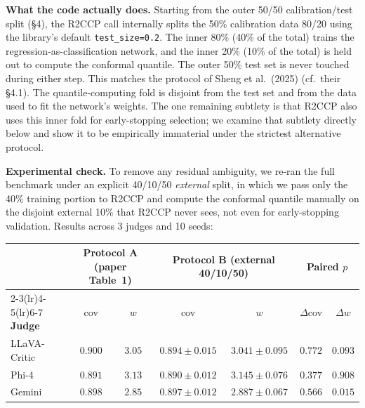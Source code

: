 \documentclass[11pt]{article}
\begin{document}
\textbf{What the code actually does.} Starting from the outer 50/50 calibration/test split (\S 4), the R2CCP call internally splits the 50\% calibration data 80/20 using the library's default \texttt{test\_size=0.2}. The inner 80\% (40\% of the total) trains the regression-as-classification network, and the inner 20\% (10\% of the total) is held out to compute the conformal quantile. The outer 50\% test set is never touched during either step. This matches the protocol of Sheng et al.\ (2025) (cf.\ their \S 4.1). The quantile-computing fold is disjoint from the test set and from the data used to fit the network's weights. The one remaining subtlety is that R2CCP also uses this inner fold for early-stopping selection; we examine that subtlety directly below and show it to be empirically immaterial under the strictest alternative protocol.

\textbf{Experimental check.} To remove any residual ambiguity, we re-ran the full benchmark under an explicit 40/10/50 \emph{external} split, in which we pass only the 40\% training portion to R2CCP and compute the conformal quantile manually on the disjoint external 10\% that R2CCP never sees, not even for early-stopping validation. Results across 3 judges and 10 seeds:

\begin{center}
\footnotesize
\setlength{\tabcolsep}{4pt}
\begin{tabular}{l cc cc cc}
\toprule
 & \multicolumn{2}{c}{\textbf{Protocol A (paper Table~1)}} & \multicolumn{2}{c}{\textbf{Protocol B (external 40/10/50)}} & \multicolumn{2}{c}{\textbf{Paired $p$}} \\
\cmidrule(lr){2-3}\cmidrule(lr){4-5}\cmidrule(lr){6-7}
\textbf{Judge} & cov & $w$ & cov & $w$ & $\Delta$cov & $\Delta w$ \\
\midrule
LLaVA-Critic & $0.900$ & $3.05$ & $0.894 \pm 0.015$ & $3.041 \pm 0.095$ & $0.772$ & $0.093$ \\
Phi-4        & $0.891$ & $3.13$ & $0.890 \pm 0.012$ & $3.145 \pm 0.076$ & $0.377$ & $0.908$ \\
Gemini       & $0.898$ & $2.85$ & $0.897 \pm 0.012$ & $2.887 \pm 0.067$ & $0.566$ & $0.015$ \\
\bottomrule
\end{tabular}
\end{center}
\end{document}
